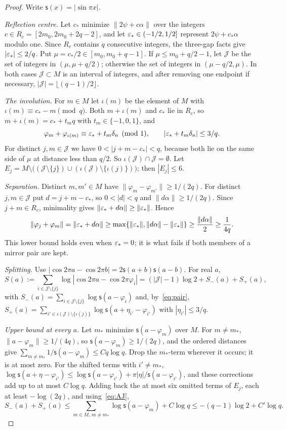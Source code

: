 \begin{proof}
Write $\mathsf s(x)=|\sin\pi x|$.

\emph{Reflection centre.} Let $c_*$ minimize $\|2\psi+c\alpha\|$ over the integers $c\in R_c=[2m_0,2m_0+2q-2]$, and let $\varepsilon_*\in(-1/2,1/2]$ represent $2\psi+c_*\alpha$ modulo one. Since $R_c$ contains $q$ consecutive integers, the three-gap facts give $|\varepsilon_*|\le2/q$. Put $\mu=c_*/2\in[m_0,m_0+q-1]$. If $\mu\le m_0+q/2-1$, let $\mathcal J$ be the set of integers in $(\mu,\mu+q/2)$; otherwise the set of integers in $(\mu-q/2,\mu)$. In both cases $\mathcal J\subset M$ is an interval of integers, and after removing one endpoint if necessary, $|\mathcal J|=\lfloor(q-1)/2\rfloor$.

\emph{The involution.} For $m\in M$ let $\iota(m)$ be the element of $M$ with $\iota(m)\equiv c_*-m\pmod q$. Both $m+\iota(m)$ and $c_*$ lie in $R_c$, so $m+\iota(m)=c_*+t_mq$ with $t_m\in\{-1,0,1\}$, and
\begin{equation}\label{eq:pair}
\varphi_m+\varphi_{\iota(m)}\equiv\varepsilon_*+t_m\delta_n\pmod1,\qquad|\varepsilon_*+t_m\delta_n|\le3/q.
\end{equation}
For distinct $j,m\in\mathcal J$ we have $0<|j+m-c_*|<q$, because both lie on the same side of $\mu$ at distance less than $q/2$. So $\iota(\mathcal J)\cap\mathcal J=\emptyset$. Let $E_j=M\setminus\bigl((\mathcal J\setminus\{j\})\cup(\iota(\mathcal J)\setminus\{\iota(j)\})\bigr)$; then $|E_j|\le6$.

\emph{Separation.} Distinct $m,m'\in M$ have $\|\varphi_m-\varphi_{m'}\|\ge1/(2q)$. For distinct $j,m\in\mathcal J$ put $d=j+m-c_*$, so $0<|d|<q$ and $\|d\alpha\|\ge1/(2q)$. Since $j+m\in R_c$, minimality gives $\|\varepsilon_*+d\alpha\|\ge\|\varepsilon_*\|$. Hence
\[
\|\varphi_j+\varphi_m\|=\|\varepsilon_*+d\alpha\|\ge\max\{\|\varepsilon_*\|,\|d\alpha\|-\|\varepsilon_*\|\}\ge\frac{\|d\alpha\|}2\ge\frac1{4q}.
\]
This lower bound holds even when $\varepsilon_*=0$; it is what fails if both members of a mirror pair are kept.

\emph{Splitting.} Use $|\cos2\pi a-\cos2\pi b|=2\mathsf s(a+b)\mathsf s(a-b)$. For real $a$,
\[
S(a):=\sum_{i\in\mathcal J\setminus\{j\}}\log|\cos2\pi a-\cos2\pi\varphi_i|=(|\mathcal J|-1)\log2+S_-(a)+S_+(a),
\]
with $S_-(a)=\sum_{i\in\mathcal J\setminus\{j\}}\log\mathsf s(a-\varphi_i)$ and, by~\eqref{eq:pair}, $S_+(a)=\sum_{i'\in\iota(\mathcal J)\setminus\{\iota(j)\}}\log\mathsf s(a+\eta_{i'}-\varphi_{i'})$ with $|\eta_{i'}|\le3/q$.

\emph{Upper bound at every $a$.} Let $m_*$ minimize $\mathsf s(a-\varphi_m)$ over $M$. For $m\ne m_*$, $\|a-\varphi_m\|\ge1/(4q)$, so $\mathsf s(a-\varphi_m)\ge1/(2q)$, and the ordered distances give $\sum_{m\ne m_*}1/\mathsf s(a-\varphi_m)\le Cq\log q$. Drop the $m_*$-term wherever it occurs; it is at most zero. For the shifted terms with $i'\ne m_*$, $\log\mathsf s(a+\eta-\varphi_{i'})\le\log\mathsf s(a-\varphi_{i'})+\pi|\eta|/\mathsf s(a-\varphi_{i'})$, and these corrections add up to at most $C\log q$. Adding back the at most six omitted terms of $E_j$, each at least $-\log(2q)$, and using~\eqref{eq:AJ},
\[
S_-(a)+S_+(a)\le\sum_{m\in M,\,m\ne m_*}\log\mathsf s(a-\varphi_m)+C\log q\le-(q-1)\log2+C'\log q.
\]


\end{proof}
